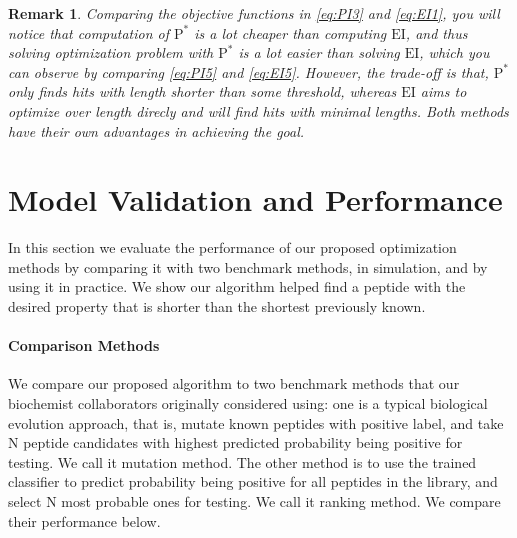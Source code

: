 \documentclass[12pt]{article}
\newcommand{\EI}{\mathrm{EI}}
\newcommand{\PI}{\text{P}^*}
\newtheorem{remark}{Remark}
\begin{document}
\begin{remark}
Comparing the objective functions in \eqref{eq:PI3} and \eqref{eq:EI1}, you will notice that computation of $\PI$ is a lot cheaper than computing $\EI$, and thus solving optimization problem with $\PI$ is a lot easier than solving $\EI$, which you can observe by comparing \eqref{eq:PI5} and \eqref{eq:EI5}. However, the trade-off is that, $\PI$ only finds hits with length shorter than some threshold, whereas $\EI$ aims to optimize over length direcly and will find hits with minimal lengths. Both methods have their own advantages in achieving the goal.
\end{remark}


\section{Model Validation and Performance}
In this section we evaluate the performance of our proposed optimization methods by comparing it with two benchmark methods, in simulation, and by using it in practice.  We show our algorithm helped find a peptide with the desired property that is shorter than the shortest previously known.


\paragraph{Comparison Methods}
We compare our proposed algorithm to two benchmark methods that our biochemist collaborators originally considered using: one is a typical biological evolution approach, that is, mutate known peptides with positive label, and take N peptide candidates with highest predicted probability being positive for testing. We call it mutation method. The other method is to use the trained classifier to predict probability being positive for all peptides in the library, and select N most probable ones for testing. We call it ranking method. We compare their performance below. %
\end{document}
